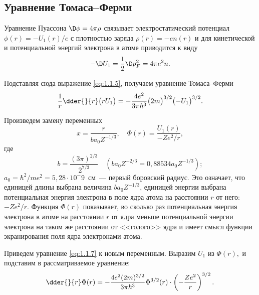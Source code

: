   \subsection{Уравнение Томаса--Ферми}
  
  Уравнение Пуассона \( \D\phi = 4\pi\rho \) связывает электростатический
  потенциал \( \phi(r) = -U_1(r) / e \) с плотностью заряда
  \( \rho(r) = -en(r) \) и для кинетической и потенциальной энергий электрона в
  атоме приводится к виду
  \begin{equation}
    -\D U_1 = \frac{1}{2}\D p_F^2 = 4\pi e^2 n.
    \label{eq:1.1.6}
  \end{equation}
  
  Подставляя сюда выражение \eqref{eq:1.1.5}, получаем уравнение Томаса--Ферми
  \begin{equation}
    \frac{1}{r}\dder{}{r}\bigl(rU_1\big) = -\frac{4e^2}{3\pi\hbar^3}
      \bigl(2m\big)^{3 / 2} \bigl(-U_1\big)^{3 / 2}.
    \label{eq:1.1.7}
  \end{equation}
  
  Произведем замену переменных
  \[
    x = \frac{r}{ba_0Z^{-1 / 3}}, \quad \Phi(r) = \frac{U_1(r)}{-Ze^2 / r},
  \]
  где
  \[
    b = \frac{(3\pi)^{2 / 3}}{2^{7 / 3}} \quad
      \left(ba_0Z^{-2 / 3} = 0,\!88534a_0Z^{-1 / 3}\right);
  \]
  \( a_0 = \hbar^2 / me^2 = 5,\!28\cdot 10^-9 \)~см~--- первый боровский радиус.
  Это означает, что единицей длины выбрана величина \( ba_0 Z^{-1 / 3} \),
  единицей энергии выбрана потенциальная энергия электрона в поле ядра атома на
  расстоянии \( r \) от него: \( - Ze^2 / r \). Функция \( \Phi(r) \)
  показывает, во сколько раз потенциальная энергия электрона в атоме на
  расстоянии \( r \) от ядра меньше потенциальной энергии электрона на таком же
  расстоянии от <<голого>> ядра и имеет смысл функции экранирования поля ядра
  электронами атома.
  
  Приведем уравнение \eqref{eq:1.1.7} к новым переменным. Выразим \( U_1 \) из
  \( \Phi(r), \) и подставим в рассматриваемое уравнение:
  \[
    \dder{}{r}\Phi(r)= -\frac{4e^2(2m)^{3 / 2}}{3\pi\hbar^3} \Phi^{3 / 2}(r)
      \cdot \left( -\frac{Ze^2}{r} \right)^{3 / 2}.
  \]

